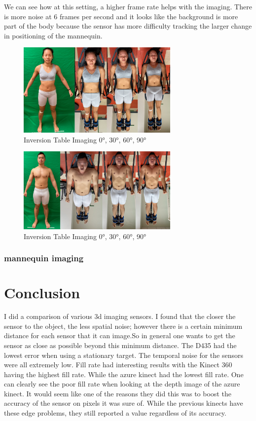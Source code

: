 We can see how at this setting, a higher frame rate helps with the imaging. There is more noise at 6 frames per second and it looks like the background is more part of the body because the sensor has more difficulty tracking the larger change in positioning of the mannequin.
\begin{figure}[h]
	\caption{Inversion Table Imaging \ang{0}, \ang{30}, \ang{60}, \ang{90}}
	\centering
	\includegraphics[width=0.7\textwidth]{images/en_inversion.png}
\end{figure}
\begin{figure}[h]
	\caption{Inversion Table Imaging \ang{0}, \ang{30}, \ang{60}, \ang{90}}
	\centering
	\includegraphics[width=0.7\textwidth]{images/mw_inversion.png}
\end{figure}


\subsection{mannequin imaging}





\chapter{Conclusion}

I did a comparison of various 3d imaging sensors. I found that the closer the sensor to the object, the less spatial noise; however there is a certain minimum distance for each sensor that it can image.So in general one wants to get the sensor as close as possible beyond this minimum distance. The D435 had the lowest error when using a stationary target. The temporal noise for the sensors were all extremely low. Fill rate had interesting results with the Kinect 360 having the highest fill rate. While the azure kinect had the lowest fill rate. One can clearly see the poor fill rate when looking at the depth image of the azure kinect. It would seem like one of the reasons they did this was to boost the accuracy of the sensor on pixels it was sure of. While the previous kinects have these edge problems, they still reported a value regardless of its accuracy.


